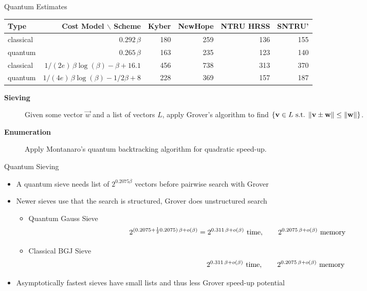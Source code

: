 \documentclass[xcolor=table,10pt,aspectratio=169]{beamer}
\def\enumworstfit{\(1/(2e)\, \beta \log(\beta) - \beta + 16.1\)}
\def\qenumworstfit{\(1/(4e)\, \beta \log(\beta) - 1/2\beta + 8\)}
\def\robl{\rowcolor{DarkBlue!20}}
\def\rore{\rowcolor{DarkRed!20}}
\begin{document}
\begin{frame}[label={sec:orge58f980}]{Quantum Estimates}
\begin{center}
\small{
\begin{center}
\begin{tabular}{lrrrrr}
\textbf{Type} & \textbf{Cost Model} $\backslash$ \textbf{Scheme} & \textbf{Kyber} & \textbf{NewHope} & \textbf{NTRU HRSS} & \textbf{SNTRU'}\\
\hline
\rore classical & \(0.292\,β\) & 180 & 259 & 136 & 155\\
\rore quantum & \(0.265\,\beta\) & 163 & 235 & 123 & 140\\
\hline
\robl classical & \enumworstfit & 456 & 738 & 313 & 370\\
\robl quantum & \qenumworstfit & 228 & 369 & 157 & 187\\
\end{tabular}

\end{center}
}
\end{center}


\begin{description}
\item[{{\color{LightRed} \textbf{Sieving} }}] Given some vector \(\vec{w}\) and a list of vectors \(L\), apply Grover’s algorithm to find \(\{\vec{v} \in L \textnormal{ s.t. } \|\vec{v} \pm \vec{w}\| \leq \|\vec{w}\|\}\).

\item[{{\color{DarkBlue} \textbf{Enumeration} }}] Apply Montanaro’s quantum backtracking algorithm for quadratic speed-up.
\end{description}
\end{frame}

\begin{frame}[label={sec:orga00f3cb}]{Quantum Sieving}
\begin{itemize}
\item A quantum sieve needs list of \(2^{0.2075 \beta}\) vectors before pairwise search with Grover

\item Newer sieves use that the search is structured, Grover does unstructured search
\begin{itemize}
\item Quantum Gauss Sieve \[2^{(0.2075 + \frac{1}{2} 0.2075)\, \beta + o(\beta)} = 2^{0.311\, \beta + o(\beta)} \textnormal{ time},\qquad 2^{0.2075\, \beta + o(\beta)} \textnormal{ memory}\]
\item Classical BGJ Sieve  \[\phantom{2^{(0.2075 + \frac{1}{2} 0.2075)\, \beta + o(\beta)} = }2^{0.311\, \beta + o(\beta)}\textnormal{ time}, \qquad 2^{0.2075\, \beta + o(\beta)} \textnormal{ memory}\]
\end{itemize}
\item Asymptotically fastest sieves have small lists and thus less Grover speed-up potential
\end{itemize}
\end{frame}
\end{document}

